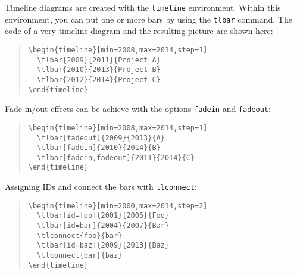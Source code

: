 \documentclass{article}
\begin{document}
Timeline diagrams are created with the \texttt{timeline} environment. Within this environment, you can put one or more bars by using the \texttt{tlbar} command. The code of a very timeline diagram and the resulting picture are shown here:
\begin{quote}\small
\begin{verbatim}
\begin{timeline}[min=2008,max=2014,step=1]
  \tlbar{2009}{2011}{Project A}
  \tlbar{2010}{2013}{Project B}
  \tlbar{2012}{2014}{Project C}
\end{timeline}
\end{verbatim}
\end{quote}
\begin{quote}
\begin{timeline}[min=2008,max=2014,step=1]
\end{timeline}
\end{quote}
Fade in/out effects can be achieve with the options \texttt{fadein} and \texttt{fadeout}:
\begin{quote}\small
\begin{verbatim}
\begin{timeline}[min=2008,max=2014,step=1]
  \tlbar[fadeout]{2009}{2013}{A}
  \tlbar[fadein]{2010}{2014}{B}
  \tlbar[fadein,fadeout]{2011}{2014}{C}
\end{timeline}
\end{verbatim}
\end{quote}
\begin{quote}
\begin{timeline}[min=2008,max=2014,step=1]
\end{timeline}
\end{quote}
Assigning IDs and connect the bars with \texttt{tlconnect}:
\begin{quote}\small
\begin{verbatim}
\begin{timeline}[min=2000,max=2014,step=2]
  \tlbar[id=foo]{2001}{2005}{Foo}
  \tlbar[id=bar]{2004}{2007}{Bar}
  \tlconnect{foo}{bar}
  \tlbar[id=baz]{2009}{2013}{Baz}
  \tlconnect{bar}{baz}
\end{timeline}
\end{verbatim}
\end{quote}
\begin{quote}
\begin{timeline}[min=2000,max=2014,step=2]
\end{timeline}
\end{quote}
\end{document}
